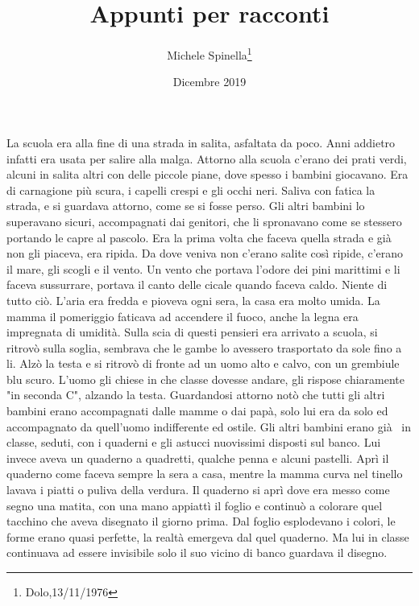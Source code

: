 \documentclass[12pt, a4paper]{article}
\author{Michele Spinella\thanks{Dolo,13/11/1976}}
\date{Dicembre 2019}
\title{Appunti per racconti}
\begin{document}
\ttfamily
\onehalfspacing


\section*{}
La scuola era alla fine di una strada in salita, asfaltata da poco. Anni addietro infatti era usata per salire alla malga. Attorno alla scuola c'erano dei prati verdi, alcuni in salita  altri con delle piccole piane, dove spesso i bambini giocavano.
Era di carnagione più scura, i capelli crespi e gli occhi neri. Saliva con fatica la strada, e si guardava attorno, come se si fosse perso. Gli altri bambini lo superavano sicuri, accompagnati dai genitori, che li spronavano  come se stessero portando le capre al pascolo.
Era la prima volta che faceva quella strada e già non gli piaceva, era ripida.
Da dove veniva non c'erano salite così ripide, c'erano il mare, gli scogli e il vento. Un vento che portava l'odore dei pini marittimi e li faceva sussurrare, portava il canto delle cicale quando faceva caldo.
Niente di tutto ciò. L'aria era fredda e pioveva ogni sera, la casa era molto umida. La mamma il pomeriggio faticava ad accendere il fuoco, anche la legna era impregnata di umidità.
\newline
Sulla scia di questi pensieri era arrivato a scuola, si ritrovò sulla soglia, sembrava che le gambe lo avessero trasportato da sole fino a li. Alzò la testa e si ritrovò di fronte ad un uomo alto e calvo, con un grembiule blu scuro. L'uomo gli chiese in che classe dovesse andare, gli rispose chiaramente "in seconda C", alzando la testa.
Guardandosi attorno notò che tutti gli altri bambini erano accompagnati dalle mamme o dai papà, solo lui era da solo ed accompagnato da quell'uomo indifferente ed ostile.\newline
Gli altri bambini erano già  in classe, seduti, con i quaderni e gli astucci nuovissimi disposti sul banco. Lui invece aveva un quaderno a quadretti, qualche penna e alcuni pastelli. Aprì il quaderno come faceva sempre la sera a casa, mentre la mamma curva nel tinello lavava i piatti o puliva della verdura. Il quaderno si aprì dove era messo come segno una matita, con una mano appiattì il foglio e continuò a colorare quel tacchino che aveva disegnato il giorno prima.
Dal foglio esplodevano i colori, le forme erano quasi perfette, la realtà emergeva dal quel quaderno. Ma lui in classe continuava ad essere invisibile solo il suo vicino di banco guardava il disegno.
\end{document}
